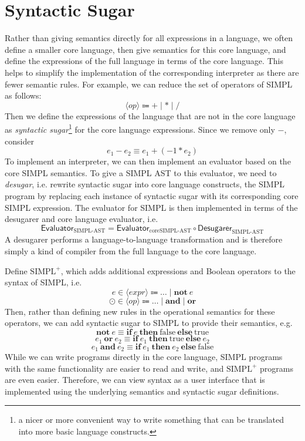 \section{Syntactic Sugar}
Rather than giving semantics directly for all expressions in a language, we often define a smaller core language, then give semantics for this core language, and define the expressions of the full language in terms of the core language. This helps to simplify the implementation of the corresponding interpreter as there are fewer semantic rules. For example, we can reduce the set of operators of SIMPL as follows:
\[
  \langle \textit{op} \rangle \Coloneqq + \mid * \mid /
\]
Then we define the expressions of the language that are not in the core language as \textit{syntactic sugar}\footnote{a nicer or more convenient way to write something that can be translated into more basic language constructs.} for the core language expressions. Since we remove only \(-\), consider
\[
  e_1 - e_2 \equiv e_1 + (-1 * e_2)
\]
To implement an interpreter, we can then implement an evaluator based on the core SIMPL semantics. To give a SIMPL AST to this evaluator, we need to \textit{desugar}, i.e. rewrite syntactic sugar into core language constructs, the SIMPL program by replacing each instance of syntactic sugar with its corresponding core SIMPL expression. The evaluator for SIMPL is then implemented in terms of the desugarer and core language evaluator, i.e.
\[
  \textsf{Evaluator}_{\text{SIMPL-AST}} = \textsf{Evaluator}_{\text{coreSIMPL-AST}} \circ \textsf{Desugarer}_{\text{SIMPL-AST}}
\]
A desugarer performs a language-to-language transformation and is therefore simply a kind of compiler from the full language to the core language.

Define \(\text{SIMPL}^+\), which adds additional expressions and Boolean operators to the syntax of SIMPL, i.e.
\[
  e \in \langle \textit{expr} \rangle \Coloneqq \dots \mid \mathbf{not}\ e
\]
\[
  \odot \in \langle \textit{op} \rangle \Coloneqq \dots \mid \mathbf{and} \mid \mathbf{or}
\]
Then, rather than defining new rules in the operational semantics for these operators, we can add syntactic sugar to SIMPL to provide their semantics, e.g.
\[
  \mathbf{not}\ e \equiv \mathbf{if}\ e\ \mathbf{then}\ \text{false}\ \mathbf{else}\ \text{true}
\]
\[
  e_1\ \mathbf{or}\ e_2 \equiv \mathbf{if}\ e_1\ \mathbf{then}\ \text{true}\ \mathbf{else}\ e_2
\]
\[
  e_1\ \mathbf{and}\ e_2 \equiv \mathbf{if}\ e_1\ \mathbf{then}\ e_2\ \mathbf{else}\ \text{false}
\]
While we can write programs directly in the core language, SIMPL programs with the same functionality are easier to read and write, and \(\text{SIMPL}^+\) programs are even easier. Therefore, we can view syntax as a user interface that is implemented using the underlying semantics and syntactic sugar definitions.

